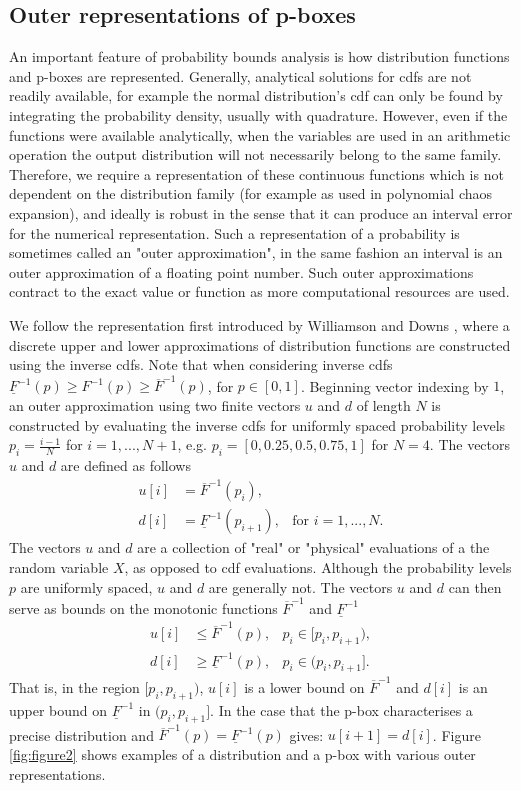 \documentclass{juliacon}
\begin{document}
\subsection{Outer representations of p-boxes}
\label{sec:outer_approx}
An important feature of probability bounds analysis is how distribution functions and p-boxes are represented. Generally, analytical solutions for cdfs are not readily available, for example the normal distribution's cdf can only be found by integrating the probability density, usually with quadrature. However, even if the functions were available analytically, when the variables are used in an arithmetic operation the output distribution will not necessarily belong to the same family. Therefore, we require a representation of these continuous functions which is not dependent on the distribution family (for example as used in polynomial chaos expansion), and ideally is robust in the sense that it can produce an interval error for the numerical representation. Such a representation of a probability is sometimes called an "outer approximation", in the same fashion an interval is an outer approximation of a floating point number. Such outer approximations contract to the exact value or function as more computational resources are used.

We follow the representation first introduced by Williamson and Downs \cite{williamson1990probabilistic}, where a discrete upper and lower approximations of distribution functions are constructed using the inverse cdfs. Note that when considering inverse cdfs $\underline{F}^{-1}(p) \geq F^{-1}(p) \geq \overline{F}^{-1}(p)$, for $p \in [0,1]$. Beginning vector indexing by $1$, an outer approximation using two finite vectors $u$ and $d$ of length $N$ is constructed by evaluating the inverse cdfs for uniformly spaced probability levels $p_{i} = \frac{i-1}{N}$ for $i = 1, ... , N+1$, e.g. $p_{i} = [0, 0.25, 0.5, 0.75, 1]$ for $N = 4$. The vectors $u$ and $d$ are defined as follows
\begin{align*}
  u[i] &= \overline{F}^{-1}(p_{i}), \\ 
  d[i] &= \underline{F}^{-1}(p_{i+1}), & \text{for } i = 1, ..., N .
\end{align*}
The vectors $u$ and $d$ are a collection of "real" or "physical" evaluations of a the random variable $X$, as opposed to cdf evaluations. Although the probability levels $p$ are uniformly spaced, $u$ and $d$ are generally not. The vectors $u$ and $d$ can then serve as bounds on the monotonic functions $\overline{F}^{-1}$ and $\underline{F}^{-1}$
\begin{align*}
  u[i] &\leq \overline{F}^{-1}(p), & p_{i} \in [p_{i}, p_{i+1} ),\\ 
  d[i] &\geq \underline{F}^{-1}(p), & p_{i} \in (p_{i}, p_{i+1}].
\end{align*}
That is, in the region $[p_{i}, p_{i+1})$, $u[i]$ is a lower bound on $\overline{F}^{-1}$ and $d[i]$ is an upper bound on $\underline{F}^{-1}$ in $(p_{i}, p_{i+1}]$. In the case that the p-box characterises a precise distribution and $\overline{F}^{-1}(p) = \underline{F}^{-1}(p)$ gives:  $u[i+1] = d[i]$. Figure \ref{fig:figure2} shows examples of a distribution and a p-box with various outer representations.
\end{document}
